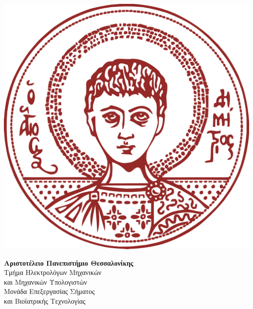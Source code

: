\documentclass{report}
\begin{document}
\justifying

\begin{titlepage}
\begin{center}
    \vspace{1cm}
        
    \begin{minipage}{.25\linewidth}
    \begin{flushright}
       \includegraphics[width=\textwidth]{images/auth_logo.png}
    \end{flushright}
    \end{minipage}
    \hfill
    \begin{minipage}{.7\linewidth}
    \begin{flushleft}
        \large
        \textbf{Αριστοτέλειο Πανεπιστήμιο Θεσσαλονίκης} \\[0.5cm]
        Τμήμα Ηλεκτρολόγων Μηχανικών \\ και Μηχανικών Υπολογιστών \\[0.2cm]

        \small{Μονάδα Επεξεργασίας Σήματος \\ και Βιοϊατρικής Τεχνολογίας}
    \end{flushleft} 
    \end{minipage}
    
    \vfill
    

\end{center}
\end{titlepage}
\end{document}
